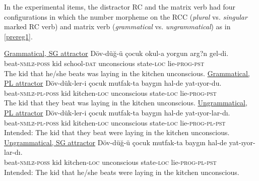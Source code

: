 \documentclass[doc]{apa6}
\begin{document}
In the experimental items, the distractor RC and the matrix verb had four configurations in which the number morpheme on the RCC (\emph{plural} vs. \emph{singular} marked RC verb) and matrix verb (\emph{grammatical} vs. \emph{ungrammatical}) as in \autoref{prereg1}.

\begin{exe}
\ex \label{prereg1}
  \begin{xlist}
  \ex \underline{Grammatical, SG attractor} \label{reg1}
      \gll D\"{o}v-d\"{u}\u{g}-\"{u} \c{c}ocuk okul-a yorgun arg?n gel-di.\\
  beat-\textsc{nmlz}-\textsc{poss} kid school-\textsc{dat} unconscious state-\textsc{loc} lie-\textsc{prog}-\textsc{pst}\\ 
      \glt The kid that he/she beats was laying in the kitchen unconscious.
  \ex \underline{Grammatical, PL attractor} \label{reg2}
      \gll D\"{o}v-d\"{u}k-ler-i \c{c}ocuk mutfak-ta bayg{\i}n hal-de yat-{\i}yor-du.\\
  beat-\textsc{nmlz}-\textsc{pl}-\textsc{poss} kid kitchen-\textsc{loc} unconscious state-\textsc{loc} lie-\textsc{prog}-\textsc{pst}\\
      \glt The kid that they beat was laying in the kitchen unconscious.
  \ex \underline{Ungrammatical, PL attractor} \label{reg3}
      \gll D\"{o}v-d\"{u}k-ler-i \c{c}ocuk mutfak-ta bayg{\i}n hal-de yat-{\i}yor-lar-d{\i}.\\
  beat-\textsc{nmlz}-\textsc{pl}-\textsc{poss} kid kitchen-\textsc{loc} unconscious state-\textsc{loc} lie-\textsc{prog}-\textsc{pl}-\textsc{pst}\\
      \glt Intended: The kid that they beat were laying in the kitchen unconscious.
  \ex \underline{Ungrammatical, SG attractor} \label{reg4}
      \gll D\"{o}v-d\"{u}\u{g}-\"{u} \c{c}ocuk mutfak-ta bayg{\i}n hal-de yat-{\i}yor-lar-d{\i}.\\
  beat-\textsc{nmlz}-\textsc{poss} kid kitchen-\textsc{loc} unconscious state-\textsc{loc} lie-\textsc{prog}-\textsc{pl}-\textsc{pst}\\
      \glt Intended: The kid that he/she beats were laying in the kitchen unconscious.
  \end{xlist}
\end{exe}
\end{document}
